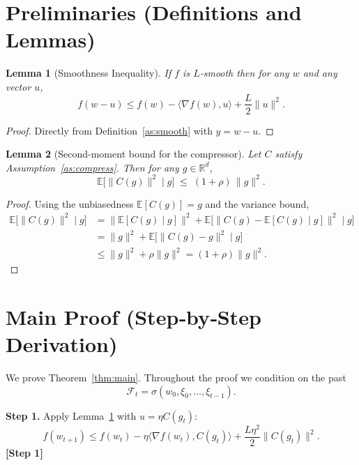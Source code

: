 \documentclass{article}
\newtheorem{lemma}{Lemma}
\begin{document}
\newpage

\section*{Preliminaries (Definitions and Lemmas)}
\begin{lemma}[Smoothness Inequality]\label{lem:smooth}
If $f$ is $L$‑smooth then for any $w$ and any vector $u$,
\[
f(w-u)\le f(w)-\langle\nabla f(w),u\rangle+\frac{L}{2}\|u\|^{2}.
\]
\end{lemma}
\begin{proof}
Directly from Definition~\ref{as:smooth} with $y=w-u$.
\end{proof}

\begin{lemma}[Second‑moment bound for the compressor]\label{lem:compress}
Let $C$ satisfy Assumption~\ref{as:compress}. Then for any $g\in\mathbb{R}^{d}$,
\[
\mathbb{E}\!\big[\|C(g)\|^{2}\mid g\big]
\;\le\;
(1+\rho)\,\|g\|^{2}.
\tag{3}
\]
\end{lemma}
\begin{proof}
Using the unbiasedness $\mathbb{E}[C(g)]=g$ and the variance bound,
\[
\begin{aligned}
\mathbb{E}\!\big[\|C(g)\|^{2}\mid g\big]
&= \big\|\mathbb{E}[C(g)\mid g]\big\|^{2}
   +\mathbb{E}\!\big[\|C(g)-\mathbb{E}[C(g)\mid g]\|^{2}\mid g\big] \\
&= \|g\|^{2} + \mathbb{E}\!\big[\|C(g)-g\|^{2}\mid g\big] \\
&\le \|g\|^{2} + \rho\|g\|^{2}
   = (1+\rho)\|g\|^{2}.
\end{aligned}
\]
\end{proof}

\newpage

\section*{Main Proof (Step‑by‑Step Derivation)}
We prove Theorem~\ref{thm:main}.  Throughout the proof we condition on the past
\[
\mathcal{F}_t=\sigma(w_0,\xi_0,\dots,\xi_{t-1}).
\]

\noindent\textbf{Step 1.} Apply Lemma~\ref{lem:smooth} with $u=\eta C(g_t)$:
\[
f(w_{t+1})\le f(w_t)-\eta\langle\nabla f(w_t),C(g_t)\rangle+\frac{L\eta^{2}}{2}\|C(g_t)\|^{2}. \tag{4}
\]
\textbf{[Step 1]}
\end{document}
